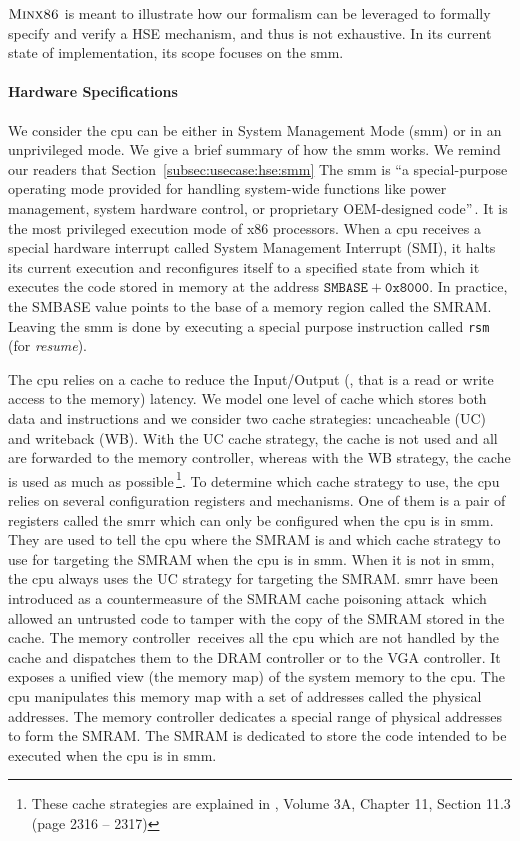 $\textsc{Minx86}$ is meant to illustrate how our formalism can be leveraged
to formally specify and verify a HSE mechanism, and thus is not exhaustive.
%
In its current state of implementation, its scope focuses on the \ac{smm}.

\paragraph{Hardware Specifications}
%
We consider the \ac{cpu} can be either in System Management Mode (\ac{smm}) or
in an unprivileged mode.
%
We give a brief summary of how the \ac{smm} works.
%
We remind our readers that Section~\ref{subsec:usecase:hse:smm}
%
The \ac{smm} is ``a special-purpose operating mode provided for handling
system-wide functions like power management, system hardware control, or
proprietary OEM-designed code''\,\cite{intel2014manual}.
%
It is the most privileged execution mode of x86 processors.
%
When a \ac{cpu} receives a special hardware interrupt called System Management
Interrupt (SMI), it halts its current execution and reconfigures itself to a
specified state from which it executes the code stored in memory at the address
$\mathtt{SMBASE} + \texttt{0x8000}$.
%
In practice, the SMBASE value points to the base of a memory region called the
SMRAM.
%
Leaving the \ac{smm} is done by executing a special purpose instruction called
\texttt{rsm} (for \emph{resume}).

The \ac{cpu} relies on a cache to reduce the Input/Output (\IO, that is a read
or write access to the memory) latency.
%
We model one level of cache which stores both data and instructions and we
consider two cache strategies: uncacheable (UC) and writeback (WB).
%
With the UC cache strategy, the cache is not used and all \IOs are forwarded to
the memory controller, whereas with the WB strategy, the cache is used as much
as possible\,\footnote{These cache strategies are explained in
  \cite{intel2014manual}, Volume 3A, Chapter 11, Section 11.3 (page 2316 --
  2317)}.
%
To determine which cache strategy to use, the \ac{cpu} relies on several
configuration registers and mechanisms.
%
One of them is a pair of registers called the \ac{smrr} which can only be
configured when the \ac{cpu} is in \ac{smm}.
%
They are used to tell the \ac{cpu} where the SMRAM is and which cache strategy
to use for \IO targeting the SMRAM when the \ac{cpu} is in \ac{smm}.  When it is
not in \ac{smm}, the \ac{cpu} always uses the UC strategy for \IO targeting the
SMRAM.
%
\ac{smrr} have been introduced as a countermeasure of the SMRAM cache poisoning
attack\,\cite{wojtczuk2009smram,duflot2009smram} which allowed an untrusted code
to tamper with the copy of the SMRAM stored in the cache.
%
The memory controller\,\cite{intel2009mch} receives all the \ac{cpu} \IOs which
are not handled by the cache and dispatches them to the DRAM controller or to
the VGA controller. It exposes a unified view (the memory map) of the system
memory to the \ac{cpu}.
%
The \ac{cpu} manipulates this memory map with a set of addresses called the
physical addresses.
%
The memory controller dedicates a special range of physical addresses to form
the SMRAM.
%
The SMRAM is dedicated to store the code intended to be executed when the
\ac{cpu} is in \ac{smm}.

